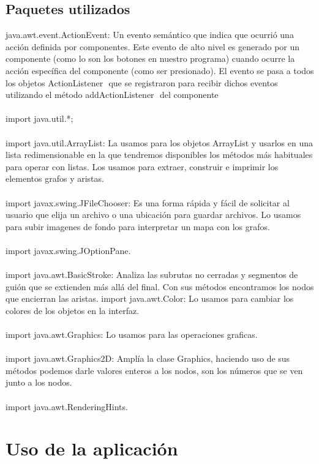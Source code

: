 \section{Paquetes utilizados}
java.awt.event.ActionEvent: Un evento semántico que indica que ocurrió una acción definida por componentes. Este evento de alto nivel es generado por un componente (como lo son los  botones en nuestro programa) cuando ocurre la acción específica del componente (como ser presionado). El evento se pasa a todos los objetos ActionListener​ ​ que se registraron para recibir dichos eventos utilizando el método addActionListener​ ​ del componente 
\\\\
import java.util.*;  
\\\\
import java.util.ArrayList:  La usamos para los objetos ArrayList y usarlos en una lista redimensionable en la que tendremos disponibles los métodos más habituales para operar con listas. Los usamos para extraer, construir e imprimir los elementos grafos y aristas. 
\\\\
import javax.swing.JFileChooser: Es una forma rápida y fácil de solicitar al usuario que elija un archivo o una ubicación para guardar archivos. Lo usamos para subir imagenes de fondo para interpretar un mapa con los grafos. 
\\\\
import javax.swing.JOptionPane. 
\\\\ 
import java.awt.BasicStroke:  Analiza las subrutas no cerradas y segmentos de guión que se extienden más allá del final. Con sus métodos encontramos los nodos que encierran las aristas.  import java.awt.Color: Lo usamos para cambiar los colores de los objetos en la interfaz. 
\\\\
import java.awt.Graphics: Lo usamos para las operaciones graficas. 
\\\\ 
import java.awt.Graphics2D: Amplía la clase Graphics, haciendo uso de sus métodos podemos darle valores enteros a los nodos, son los números que se ven junto a los nodos. 
\\\\ 
import java.awt.RenderingHints. 
       
\chapter{Uso de la aplicación}
